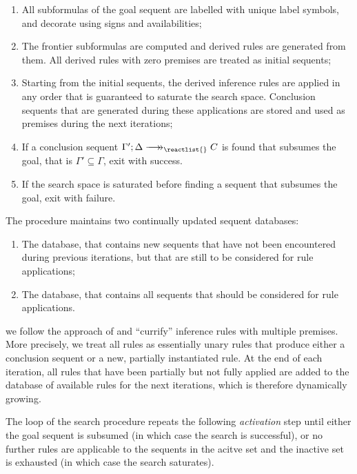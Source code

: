 \begin{enumerate}
\item All subformulas of the goal sequent are labelled with unique label
  symbols, and decorate using signs and availabilities;
\item The frontier subformulas are computed and derived rules are generated from
  them. All derived rules with zero premises are treated as initial sequents;
\item Starting from the initial sequents, the derived inference rules are
  applied in any order that is guaranteed to saturate the search
  space. Conclusion sequents that are generated during these applications are
  stored and used as premises during the next iterations;
\item If a conclusion sequent $\zfneuseq{\Gamma'}{\Delta}{\reactlist{}}{C}$ is
  found that subsumes the goal, that is $\Gamma' \subseteq \Gamma$, exit with
  success.
\item If the search space is saturated before finding a sequent that subsumes
  the goal, exit with failure.
\end{enumerate}

The procedure maintains two continually updated sequent databases:

\begin{enumerate}
\item The  database, that contains new sequents that have not
  been encountered during previous iterations, but that are still to be
  considered for rule applications;
\item The  database, that contains all sequents that
  should be considered for rule applications.
\end{enumerate}

we follow the approach of \cite{chaudhuri-thesis} and ``currify'' inference
rules with multiple premises. More precisely, we treat all rules as essentially
unary rules that produce either a conclusion sequent or a new, partially
instantiated rule. At the end of each iteration, all rules that have been
partially but not fully applied are added to the database of available rules for
the next iterations, which is therefore dynamically growing.

The loop of the search procedure repeats the following \emph{activation}
step until either the goal sequent is subsumed (in which case the search is
successful), or no further rules are applicable to the sequents in the acitve
set and the inactive set is exhausted (in which case the search saturates).

